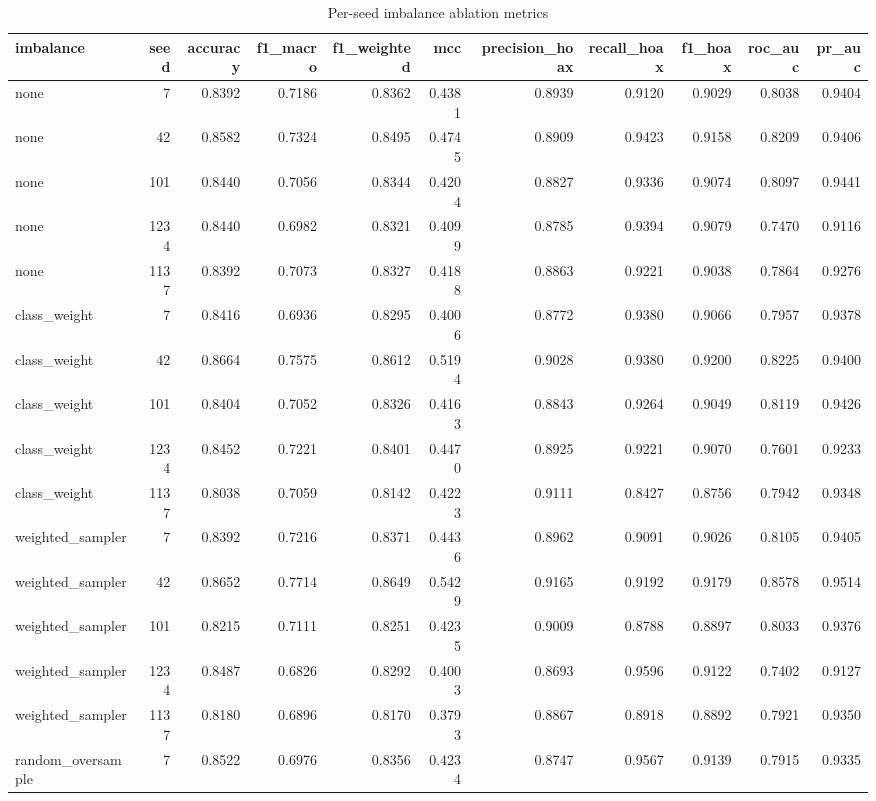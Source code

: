 \begin{table}
\caption{Per-seed imbalance ablation metrics}
\label{tab:imb_ablation_per_seed}
\begin{tabular}{lrrrrrrrrrr}
\toprule
imbalance & seed & accuracy & f1\_macro & f1\_weighted & mcc & precision\_hoax & recall\_hoax & f1\_hoax & roc\_auc & pr\_auc \\
\midrule
none & 7 & 0.8392 & 0.7186 & 0.8362 & 0.4381 & 0.8939 & 0.9120 & 0.9029 & 0.8038 & 0.9404 \\
none & 42 & 0.8582 & 0.7324 & 0.8495 & 0.4745 & 0.8909 & 0.9423 & 0.9158 & 0.8209 & 0.9406 \\
none & 101 & 0.8440 & 0.7056 & 0.8344 & 0.4204 & 0.8827 & 0.9336 & 0.9074 & 0.8097 & 0.9441 \\
none & 1234 & 0.8440 & 0.6982 & 0.8321 & 0.4099 & 0.8785 & 0.9394 & 0.9079 & 0.7470 & 0.9116 \\
none & 1137 & 0.8392 & 0.7073 & 0.8327 & 0.4188 & 0.8863 & 0.9221 & 0.9038 & 0.7864 & 0.9276 \\
class\_weight & 7 & 0.8416 & 0.6936 & 0.8295 & 0.4006 & 0.8772 & 0.9380 & 0.9066 & 0.7957 & 0.9378 \\
class\_weight & 42 & 0.8664 & 0.7575 & 0.8612 & 0.5194 & 0.9028 & 0.9380 & 0.9200 & 0.8225 & 0.9400 \\
class\_weight & 101 & 0.8404 & 0.7052 & 0.8326 & 0.4163 & 0.8843 & 0.9264 & 0.9049 & 0.8119 & 0.9426 \\
class\_weight & 1234 & 0.8452 & 0.7221 & 0.8401 & 0.4470 & 0.8925 & 0.9221 & 0.9070 & 0.7601 & 0.9233 \\
class\_weight & 1137 & 0.8038 & 0.7059 & 0.8142 & 0.4223 & 0.9111 & 0.8427 & 0.8756 & 0.7942 & 0.9348 \\
weighted\_sampler & 7 & 0.8392 & 0.7216 & 0.8371 & 0.4436 & 0.8962 & 0.9091 & 0.9026 & 0.8105 & 0.9405 \\
weighted\_sampler & 42 & 0.8652 & 0.7714 & 0.8649 & 0.5429 & 0.9165 & 0.9192 & 0.9179 & 0.8578 & 0.9514 \\
weighted\_sampler & 101 & 0.8215 & 0.7111 & 0.8251 & 0.4235 & 0.9009 & 0.8788 & 0.8897 & 0.8033 & 0.9376 \\
weighted\_sampler & 1234 & 0.8487 & 0.6826 & 0.8292 & 0.4003 & 0.8693 & 0.9596 & 0.9122 & 0.7402 & 0.9127 \\
weighted\_sampler & 1137 & 0.8180 & 0.6896 & 0.8170 & 0.3793 & 0.8867 & 0.8918 & 0.8892 & 0.7921 & 0.9350 \\
random\_oversample & 7 & 0.8522 & 0.6976 & 0.8356 & 0.4234 & 0.8747 & 0.9567 & 0.9139 & 0.7915 & 0.9335 \\

\end{tabular}
\end{table}
